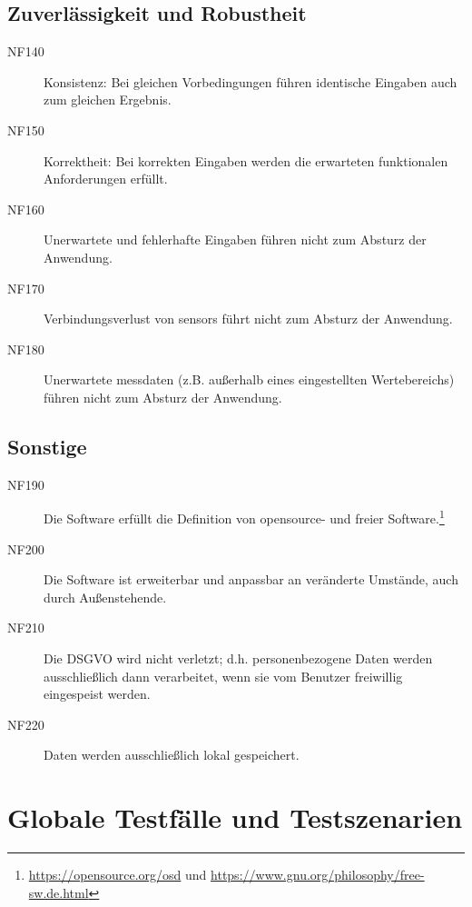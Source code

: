 \documentclass[parskip=full]{scrartcl}
\begin{document}
\subsection{Zuverlässigkeit und Robustheit}

\begin{description}

\item[NF140] Konsistenz: Bei gleichen Vorbedingungen führen identische Eingaben auch zum gleichen Ergebnis.
\item[NF150] Korrektheit: Bei korrekten Eingaben werden die erwarteten funktionalen Anforderungen erfüllt.
\item[NF160] Unerwartete und fehlerhafte Eingaben führen nicht zum Absturz der Anwendung.
\item[NF170] Verbindungsverlust von \glspl{sensor} führt nicht zum Absturz der Anwendung.
\item[NF180] Unerwartete \gls{messdaten} (z.B. außerhalb eines eingestellten Wertebereichs) führen nicht zum Absturz der Anwendung.

\end{description}

\subsection{Sonstige}

\begin{description}

\item[NF190] Die Software erfüllt die Definition von \gls{opensource}- und freier Software.\footnote{\url{https://opensource.org/osd} und \url{https://www.gnu.org/philosophy/free-sw.de.html}}
\item[NF200] Die Software ist erweiterbar und anpassbar an veränderte Umstände, auch durch Außenstehende.
\item[NF210] Die \gls{DSGVO} wird nicht verletzt; d.h. personenbezogene Daten werden ausschließlich dann verarbeitet, wenn sie vom Benutzer freiwillig eingespeist werden.
\item[NF220] Daten werden ausschließlich lokal gespeichert.

\end{description}

\clearpage
\section{Globale Testfälle und Testszenarien}\label{testfall}
\end{document}
